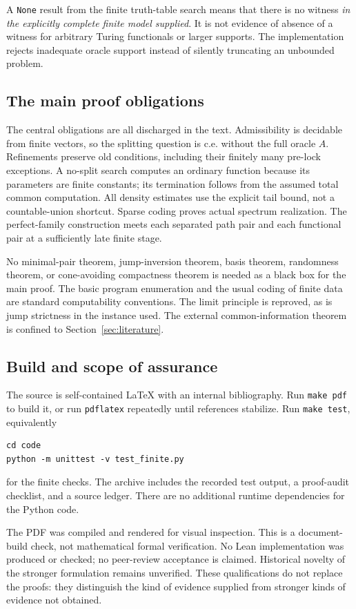 \documentclass[11pt,a4paper]{article}
\newcommand{\code}[1]{\texttt{#1}}
\theoremstyle{definition}\newtheorem{definition}[theorem]{Definition}
\theoremstyle{remark}\newtheorem{remark}[theorem]{Remark}
\begin{document}
A \code{None} result from the finite truth-table search means that there is no witness \emph{in the explicitly complete finite model supplied}. It is not evidence of absence of a witness for arbitrary Turing functionals or larger supports. The implementation rejects inadequate oracle support instead of silently truncating an unbounded problem.

\subsection{The main proof obligations}
The central obligations are all discharged in the text. Admissibility is decidable from finite vectors, so the splitting question is c.e. without the full oracle $A$. Refinements preserve old conditions, including their finitely many pre-lock exceptions. A no-split search computes an ordinary function because its parameters are finite constants; its termination follows from the assumed total common computation. All density estimates use the explicit tail bound, not a countable-union shortcut. Sparse coding proves actual spectrum realization. The perfect-family construction meets each separated path pair and each functional pair at a sufficiently late finite stage.

No minimal-pair theorem, jump-inversion theorem, basis theorem, randomness theorem, or cone-avoiding compactness theorem is needed as a black box for the main proof. The basic program enumeration and the usual coding of finite data are standard computability conventions. The limit principle is reproved, as is jump strictness in the instance used. The external common-information theorem is confined to Section~\ref{sec:literature}.

\subsection{Build and scope of assurance}
The source is self-contained LaTeX with an internal bibliography. Run \code{make pdf} to build it, or run \code{pdflatex} repeatedly until references stabilize. Run \code{make test}, equivalently
\begin{lstlisting}
cd code
python -m unittest -v test_finite.py
\end{lstlisting}
for the finite checks. The archive includes the recorded test output, a proof-audit checklist, and a source ledger. There are no additional runtime dependencies for the Python code.

The PDF was compiled and rendered for visual inspection. This is a document-build check, not mathematical formal verification. No Lean implementation was produced or checked; no peer-review acceptance is claimed. Historical novelty of the stronger formulation remains unverified. These qualifications do not replace the proofs: they distinguish the kind of evidence supplied from stronger kinds of evidence not obtained.
\end{document}
